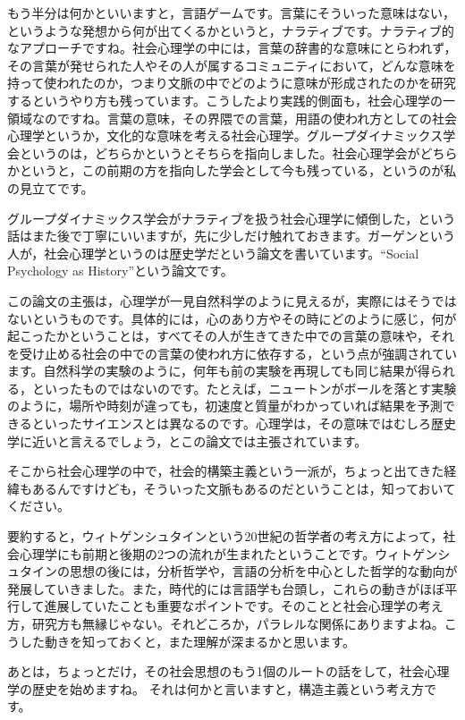 \documentclass{ltjsbook}
\begin{document}
もう半分は何かといいますと，言語ゲームです。言葉にそういった意味はない，というような発想から何が出てくるかというと，ナラティブです。ナラティブ的なアプローチですね。社会心理学の中には，言葉の辞書的な意味にとらわれず，その言葉が発せられた人やその人が属するコミュニティにおいて，どんな意味を持って使われたのか，つまり文脈の中でどのように意味が形成されたのかを研究するというやり方も残っています。こうしたより実践的側面も，社会心理学の一領域なのですね。言葉の意味，その界隈での言葉，用語の使われ方としての社会心理学というか，文化的な意味を考える社会心理学。グループダイナミックス学会というのは，どちらかというとそちらを指向しました。社会心理学会がどちらかというと，この前期の方を指向した学会として今も残っている，というのが私の見立てです。

グループダイナミックス学会がナラティブを扱う社会心理学に傾倒した，という話はまた後で丁寧にいいますが，先に少しだけ触れておきます。ガーゲンという人が，社会心理学というのは歴史学だという論文を書いています。``Social Psychology as History''という論文です\parencite{gergen1973social}。

この論文の主張は，心理学が一見自然科学のように見えるが，実際にはそうではないというものです。具体的には，心のあり方やその時にどのように感じ，何が起こったかということは，すべてその人が生きてきた中での言葉の意味や，それを受け止める社会の中での言葉の使われ方に依存する，という点が強調されています。自然科学の実験のように，何年も前の実験を再現しても同じ結果が得られる，といったものではないのです。たとえば，ニュートンがボールを落とす実験のように，場所や時刻が違っても，初速度と質量がわかっていれば結果を予測できるといったサイエンスとは異なるのです。心理学は，その意味ではむしろ歴史学に近いと言えるでしょう，とこの論文では主張されています。

そこから社会心理学の中で，社会的構築主義という一派が，ちょっと出てきた経緯もあるんですけども，そういった文脈もあるのだということは，知っておいてください。

要約すると，ウィトゲンシュタインという20世紀の哲学者の考え方によって，社会心理学にも前期と後期の2つの流れが生まれたということです。ウィトゲンシュタインの思想の後には，分析哲学や，言語の分析を中心とした哲学的な動向が発展していきました。また，時代的には言語学も台頭し，これらの動きがほぼ平行して進展していたことも重要なポイントです。そのことと社会心理学の考え方，研究方も無縁じゃない。それどころか，パラレルな関係にありますよね。こうした動きを知っておくと，また理解が深まるかと思います。

あとは，ちょっとだけ，その社会思想のもう1個のルートの話をして，社会心理学の歴史を始めますね。
それは何かと言いますと，構造主義という考え方です。
\end{document}
